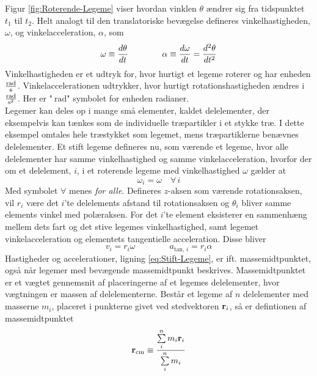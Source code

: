 Figur \ref{fig:Roterende-Legeme} viser hvordan vinklen $\theta$ ændrer sig fra tidspunktet $t_1$ til $t_2$. Helt analogt til den translatoriske bevægelse defineres vinkelhastigheden, $\omega$, og vinkelacceleration, $\alpha$, som
\begin{equation}
    \omega\equiv{d{\theta} \over d{t}} \qquad\qquad \alpha\equiv{d{\omega} \over d{t}}={d^2{\theta} \over d{t}^2}
\end{equation}
Vinkelhastigheden er et udtryk for, hvor hurtigt et legeme roterer og har enheden $\SI{}{\frac{\radian}{\second}}$. Vinkelaccelerationen udtrykker, hvor hurtigt rotationshastigheden ændres i $\SI{}{\frac{\radian}{\second\squared}}$. Her er "$\SI{}{\radian}$" symbolet for enheden radianer. \\

Legemer kan deles op i mange små elementer, kaldet delelementer, der eksempelvis kan tænkes som de individuelle træpartikler i et stykke træ. I dette eksempel omtales hele træstykket som legemet, mens træpartiklerne benævnes delelementer. Et stift legeme defineres nu, som værende et legeme, hvor alle delelementer har samme vinkelhastighed og samme vinkelacceleration, hvorfor der om et delelement, $i$, i et roterende legeme med vinkelhastighed $\omega$ gælder at
\begin{equation}
\omega_i = \omega \quad\forall\, i
\end{equation}
Med symbolet $\forall$ menes \textit{for alle}. Defineres $z$-aksen som værende rotationsaksen, vil $r_i$ være det $i$'te delelements afstand til rotationsaksen og $\theta_i$ bliver samme elements vinkel med polæraksen. For det $i$'te element eksisterer en sammenhæng mellem dets fart og det stive legemes vinkelhastighed, samt legemet vinkelacceleration og elementets tangentielle acceleration. Disse bliver
\begin{equation} \label{eq:Stift-Legeme}
    v_i=r_i\omega \qquad\qquad a_{\text{tan},\,i}=r_i\alpha
\end{equation}
Hastigheder og accelerationer, ligning \ref{eq:Stift-Legeme}, er ift. massemidtpunktet, også når legemer med bevægende massemidtpunkt beskrives. Massemidtpunktet er et vægtet gennemsnit af placeringerne af et legemes delelementer, hvor vægtningen er massen af delelementerne. Består et legeme af $n$ delelementer med masserne $m_i$, placeret i punkterne givet ved stedvektoren $\mathbf{r}_i$, så er defintionen af massemidtpunktet
\begin{equation}
\mathbf{r}_\text{cm} \equiv \dfrac{\sum\limits_i^nm_i\mathbf{r}_i}{\sum\limits_i^nm_i}
\end{equation}
